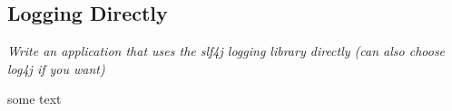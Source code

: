 \subsection{Logging Directly}
\textit{Write an application that uses the slf4j logging library directly (can also choose log4j if you want)}

some text
